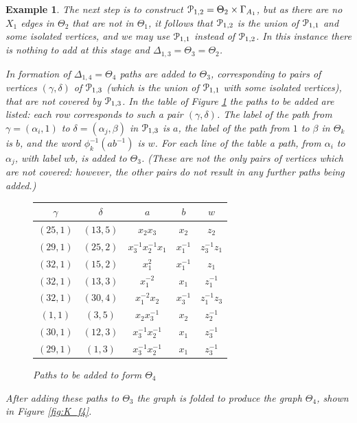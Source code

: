 \documentclass[a4paper,12pt]{article}
\renewcommand{\a}{\alpha }
\renewcommand{\b}{\beta }
\newcommand{\G}{\Gamma }
\newcommand{\g}{\gamma }
\newcommand{\D}{\Delta }
\renewcommand{\d}{\delta }
\newcommand{\T}{\Theta }
\newcommand{\cP}{{\cal{P}}}
\newtheorem{exam}[theorem]{Example}
\newenvironment{example}{\begin{exam} \rm}{\end{exam}}
\numberwithin{equation}{section}
\numberwithin{figure}{section}
\begin{document}
\begin{example}
The next step is to construct
$\cP_{1,2}=\T_2\times \G_{A_1}$, but as there are no $X_1$ edges in
$\T_2$ that are not in $\T_1$, it follows that  $\cP_{1,2}$ is the
union of $\cP_{1,1}$ and some isolated vertices, and we may use
$\cP_{1,1}$ instead of $\cP_{1,2}$. In this instance there is nothing to
add at this stage and $\D_{1,3}=\T_3=\T_2$.

In formation of $\D_{1,4}=\T_4$ paths are added to $\T_3$,
corresponding to pairs of vertices $(\g,\d)$ of $\cP_{1,3}$ (which 
is the union of $\cP_{1,1}$ with some isolated vertices), that 
are not covered by $\cP_{1,3}$.
In the table of Figure \ref{tab:T4} the paths to be added are listed:
each row corresponds to such a pair $(\g,\d)$. The
label of the path from $\g=(\a_i,1)$ to $\d=(\a_j,\b)$
in $\cP_{1,3}$ is $a$,
the label of the path from $1$ to $\b$ in $\T_k$ is $b$, and the word
$\phi_k^{-1}(ab^{-1})$ is $w$. For each line of the table a path,
from $\a_i$ to $\a_j$, with label $wb$, is added to $\T_3$.
(These are not the only pairs of vertices which are not
covered: however, the other pairs do not result in any further paths
being added.)
\begin{figure}
\begin{center}
\renewcommand{\arraystretch}{1.5}
\begin{tabular}{|c|c|c|c|c|}
\hline
$\g$& $\d$ & $a$ & $b$ & $w$\\\hline\hline
$(25,1)$ & $(13,5)$ & $x_2x_3$ & $x_2$ & $z_2 $\\\hline
$(29,1)$ & $(25,2)$ & $x_3^{-1}x_2^{-1}x_1$ & $x_1^{-1}$ & $z_3^{-1}z_1$\\\hline
$(32,1)$ & $(15,2)$ & $x_1^2$ & $ x_1^{-1}$ & $z_1$\\\hline
$(32,1)$ & $(13,3)$ & $x_1^{-2} $ & $x_1 $ & $z_1^{-1} $\\\hline
$(32,1)$ & $(30,4)$ & $x_1^{-2}x_2$ & $x_3^{-1} $ & $z_1^{-1}z_3$\\\hline
$(1,1)$ & $(3,5)$ & $x_2x_3^{-1} $ & $x_2 $ & $z_2^{-1} $\\\hline
$(30,1)$ & $(12,3)$ & $x_3^{-1}x_2^{-1}$ & $x_1 $ & $z_3^{-1} $\\\hline
$(29,1)$ & $(1,3)$ & $x_3^{-1}x_2^{-1}$ & $x_1 $ & $z_3^{-1} $\\\hline
\end{tabular}
\renewcommand{\arraystretch}{1}
\end{center}
\caption{Paths to be added to form $\T_4$}
\label{tab:T4}
\end{figure}
After adding these paths to $\T_3$ the graph is folded to
produce the graph $\T_4$, shown in Figure \ref{fig:K_f4}.


\end{example}
\end{document}
